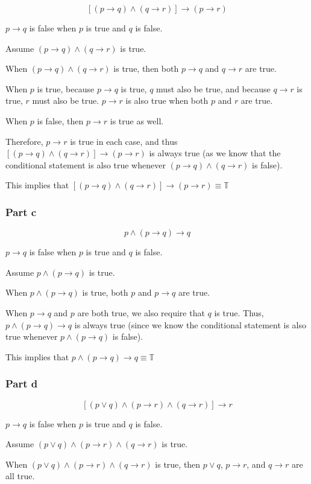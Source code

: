 \documentclass[12pt]{article}
\begin{document}
\[
[(p \to q) \land (q \to r)] \to (p \to r)
\]

$p \to q$ is false when $p$ is true and $q$ is false.

Assume $(p \to q) \land (q \to r)$ is true.

When $(p \to q) \land (q \to r)$ is true, then both
$p \to q$ and $q \to r$ are true.

When $p$ is true, because $p \to q$ is true, $q$ must also be true, and
because $q \to r$ is true, $r$ must also be true. $p \to r$ is also true
when both $p$ and $r$ are true.

When $p$ is false, then $p \to r$ is true as well.

Therefore, $p \to r$ is true in each case, and thus
$[(p \to q) \land (q \to r)] \to (p \to r)$ is
always true (as we know that the conditional statement is also true whenever
$(p \to q) \land (q \to r)$ is false).

This implies that
$[(p \to q) \land (q \to r)] \to (p \to r) \equiv \mathbb{T} $ 

\subsubsection*{Part c}

\[
p \land (p \to q) \to q
\]

$p \to q$ is false when $p$ is true and $q$ is false.

Assume $p \land (p \to q)$ is true.

When $p \land (p \to q)$ is true, both $p$ and $p \to q$ are true.

When $p \to q$ and $p$ are both true, we also require that $q$ is true. 
Thus, $p \land (p \to q) \to q$ is always true (since we know the conditional 
statement is also true whenever $p \land (p \to q)$ is false). 

This implies that $p \land (p \to q) \to q \equiv \mathbb{T} $

\subsubsection*{Part d}

\[
[(p \lor q) \land (p \to r) \land (q \to r)] \to r
\]

$p \to q$ is false when $p$ is true and $q$ is false.

Assume $(p \lor q) \land (p \to r) \land (q \to r)$ is true.

When $(p \lor q) \land (p \to r) \land (q \to r)$ is true, then $p \lor q$, 
$p \to r$, and $q \to r$ are all true.
\end{document}
